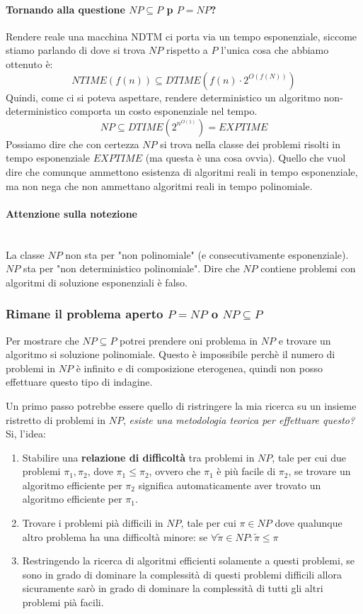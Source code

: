 \documentclass{article}
\begin{document}
\paragraph{Tornando alla questione $NP\subseteq P$ p $P=NP$?}
Rendere reale una macchina NDTM ci porta via un tempo esponenziale, siccome stiamo
parlando di dove si trova $NP$ rispetto a $P$ l'unica cosa che abbiamo ottenuto è:
$$NTIME(f(n))\subseteq DTIME(f(n)\cdot 2^{O(f(N))})$$
Quindi, come ci si poteva aspettare, rendere deterministico un algoritmo non-deterministico
comporta un costo esponenziale nel tempo.
$$NP\subseteq DTIME(2^{n^{O(1)}})=EXPTIME$$
Possiamo dire che con certezza $NP$ si trova nella classe dei problemi risolti in
tempo esponenziale $EXPTIME$ (ma questa è una cosa ovvia). Quello che vuol dire che comunque ammettono
esistenza di algoritmi reali in tempo esponenziale, ma non nega che non ammettano algoritmi
reali in tempo polinomiale.

\paragraph{Attenzione sulla notezione}\mbox{}\\
La classe $NP$ non sta per "non polinomiale" (e consecutivamente esponenziale). $NP$
sta per "non deterministico polinomiale". Dire che $NP$ contiene problemi con algoritmi
di soluzione esponenziali è falso.

\subsubsection{Rimane il problema aperto $P=NP$ o $NP\subseteq P$}
Per mostrare che $NP\subseteq P$ potrei prendere oni problema in $NP$ e trovare
un algoritmo si soluzione polinomiale. Questo è impossibile perchè il numero
di problemi in $NP$ è infinito e di composizione eterogenea, quindi non posso effettuare
questo tipo di indagine.

Un primo passo potrebbe essere quello di ristringere la mia ricerca su un insieme ristretto
di problemi in $NP$, \textit{esiste una metodologia teorica per effettuare questo?} Si,
l'idea:
\begin{enumerate}
    \item Stabilire una \textbf{relazione di difficoltà} tra problemi in $NP$, tale
    per cui due problemi $\pi_1,\pi_2$, dove $\pi_1\leq\pi_2$, ovvero che $\pi_1$ è
    più facile di $\pi_2$, se trovare un algoritmo efficiente per $\pi_2$ significa
    automaticamente aver trovato un algoritmo efficiente per $\pi_1$.

    \item Trovare i problemi pià difficili in $NP$, tale per cui $\pi\in NP$
    dove qualunque altro problema ha una difficoltà minore: se $\forall\tilde{\pi}\in NP:\tilde{\pi}\leq\pi$

    \item Restringendo la ricerca di algoritmi efficienti solamente a questi problemi, se sono
    in grado di dominare la complessità di questi problemi difficili allora sicuramente
    sarò in grado di dominare la complessità di tutti gli altri problemi pià facili.
\end{enumerate}
\end{document}
